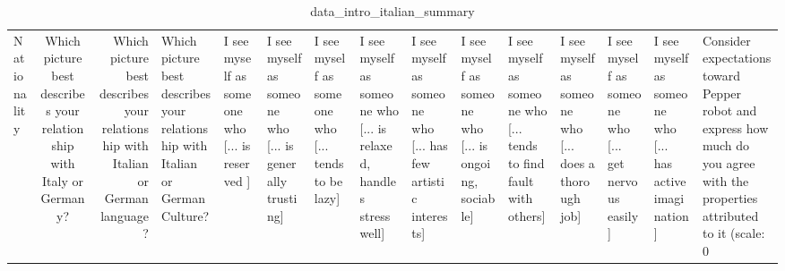 \begin{table}
\caption{data_intro_italian_summary}
\label{tab:data_intro_italian_summary}
\begin{tabular}{lcr}
\toprule
Nationality & Which picture best describes your relationship with Italy or Germany? & Which picture best describes your relationship with Italian or German language? & Which picture best describes your relationship with Italian or German Culture? & I see myself as someone who  [... is reserved ] & I see myself as someone who  [... is generally trusting] & I see myself as someone who  [... tends to be lazy] & I see myself as someone who  [... is relaxed, handles stress well] & I see myself as someone who  [... has few artistic interests] & I see myself as someone who  [... is ongoing, sociable] & I see myself as someone who  [... tends to find fault with others] & I see myself as someone who  [... does a thorough job] & I see myself as someone who  [... get nervous easily] & I see myself as someone who  [... has active imagination] & Consider expectations toward Pepper robot and express how much do you agree with the properties attributed to it (scale: 0%
\end{tabular}
\end{table}
